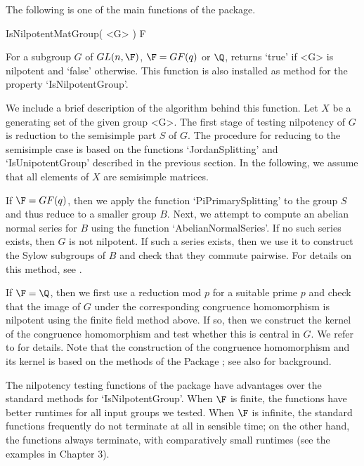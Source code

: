 
The following is one of the main functions of the 
package.

\> IsNilpotentMatGroup( <G> ) F

For a subgroup $G$ of $GL(n,\F)$, $\F=GF(q)$ or $\Q$, returns
`true' if <G> is nilpotent and `false' otherwise. This function is
also installed as method for the property `IsNilpotentGroup'.

We include a brief description of the algorithm behind this function.
Let $X$ be a generating set of the given group <G>. The first stage
of testing nilpotency of $G$ is reduction to the semisimple part $S$
of $G$. The procedure for reducing to the semisimple case is based on
the  functions `JordanSplitting' and `IsUnipotentGroup'
described in the previous section. In the following, we assume that
all elements of $X$ are semisimple matrices.

If $\F=GF(q)$, then we apply the function `PiPrimarySplitting' to
the group $S$ and thus reduce to a smaller group $B$. Next, we
attempt to compute an abelian normal series for $B$ using the
function `AbelianNormalSeries'. If no such series exists, then $G$
is not nilpotent. If such a series exists, then we use it to
construct the Sylow subgroups of $B$ and check that they commute
pairwise. For details on this method, see \cite{DF06}.

If $\F=\Q$, then we first use a reduction mod $p$ for a suitable
prime $p$ and check that the image of $G$ under the corresponding
congruence homomorphism is nilpotent using the finite field method
above. If so, then we construct the kernel of the congruence
homomorphism and test whether this is central in $G$. We refer to
\cite{DF07} for details. Note that the construction of the
congruence homomorphism and its kernel is based on the methods of
the Package ; see also \cite{AE05} for
background.

The nilpotency testing functions of the package 
have advantages over the standard {\GAP} methods for
`IsNilpotentGroup'. When $\F$ is finite, the 
functions have better runtimes for all input groups we tested.
When $\F$ is infinite, the standard {\GAP} functions frequently do
not terminate at all in sensible time; on the other hand, the
 functions always terminate, with comparatively
small runtimes (see the examples in Chapter 3).

